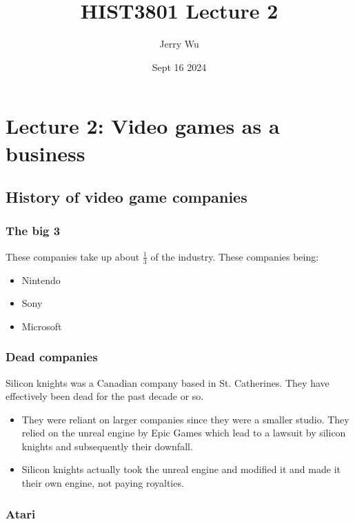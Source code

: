 \documentclass[12pt]{book}
\title{HIST3801 Lecture 2}
\author{Jerry Wu}
\date{Sept 16 2024}
\begin{document}
\maketitle

\tableofcontents

\chapter{Lecture 2: Video games as a business}

\section{History of video game companies}

\subsection{The big 3}

These companies take up about $\frac{1}{3}$ of the industry. These companies being:

\begin{itemize}
    \item Nintendo
    \item Sony
    \item Microsoft
\end{itemize}

\subsection{Dead companies}

Silicon knights was a Canadian company based in St. Catherines. They have effectively been dead for the past decade or so.

\begin{itemize}
    \item They were reliant on larger companies since they were a smaller studio. They relied on the unreal engine by Epic Games which lead to a lawsuit by silicon knights and subsequently their downfall.
    \item Silicon knights actually took the unreal engine and modified it and made it their own engine, not paying royalties.
\end{itemize}

\subsection{Atari}
\end{document}

